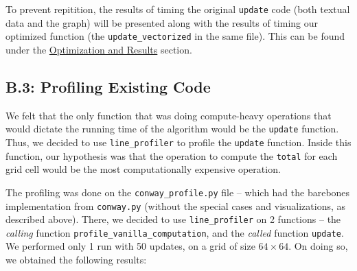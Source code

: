 \documentclass[a4paper,12pt]{article}
\begin{document}
To prevent repitition, the results of timing the original \verb|update| code (both textual data and the graph) will be presented along with the results of timing our optimized function (the \verb|update_vectorized| in the same file). This can be found under the \hyperref[sec:b4]{Optimization and Results} section.

\subsection{B.3: Profiling Existing Code}
\label{sec:b3}
We felt that the only function that was doing compute-heavy operations that would dictate the running time of the algorithm would be the \verb|update| function. Thus, we decided to use \verb|line_profiler| to profile the \verb|update| function. Inside this function, our hypothesis was that the operation to compute the \verb|total| for each grid cell would be the most computationally expensive operation.

The profiling was done on the \verb|conway_profile.py| file -- which had the barebones implementation from \verb|conway.py| (without the special cases and visualizations, as described above). There, we decided to use \verb|line_profiler| on 2 functions -- the \textit{calling} function \verb|profile_vanilla_computation|, and the \textit{called} function \verb|update|. We performed only 1 run with 50 updates, on a grid of size $64 \times 64$. On doing so, we obtained the following results: 
\end{document}
